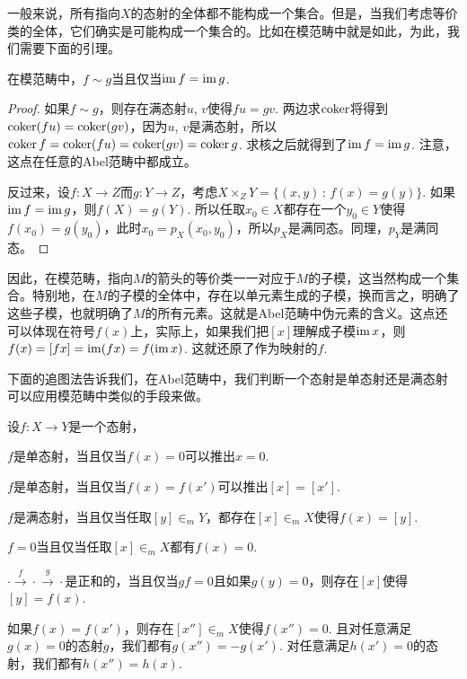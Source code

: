 一般来说，所有指向$X$的态射的全体都不能构成一个集合。但是，当我们考虑等价类的全体，它们确实是可能构成一个集合的。比如在模范畴中就是如此，为此，我们需要下面的引理。

\begin{lem}
在模范畴中，$f\sim g$当且仅当$\operatorname{im} f = \operatorname{im} g$.
\end{lem}

\begin{proof}
如果$f\sim g$，则存在满态射$u$, $v$使得$fu=gv$. 两边求$\operatorname{coker}$将得到$\operatorname{coker}(fu)=\operatorname{coker}(gv)$，因为$u$, $v$是满态射，所以$\operatorname{coker} f=\operatorname{coker}(fu)=\operatorname{coker}(gv)=\operatorname{coker} g$. 求核之后就得到了$\operatorname{im} f=\operatorname{im} g$. 注意，这点在任意的Abel范畴中都成立。

反过来，设$f:X\to Z$而$g:Y\to Z$，考虑$X\times_Z Y=\{(x,y)\,:\,f(x)=g(y)\}$. 如果$\operatorname{im} f=\operatorname{im} g$，则$f(X)=g(Y)$. 所以任取$x_0\in X$都存在一个$y_0\in Y$使得$f(x_0)=g(y_0)$，此时$x_0=p_X(x_0,y_0)$，所以$p_X$是满同态。同理，$p_Y$是满同态。
\end{proof}

因此，在模范畴，指向$M$的箭头的等价类一一对应于$M$的子模，这当然构成一个集合。特别地，在$M$的子模的全体中，存在以单元素生成的子模，换而言之，明确了这些子模，也就明确了$M$的所有元素。这就是Abel范畴中伪元素的含义。这点还可以体现在符号$f(x)$上，实际上，如果我们把$[x]$理解成子模$\operatorname{im} x$，则$f(x)=[fx]=\operatorname{im}(f x)=f(\operatorname{im} x)$. 这就还原了作为映射的$f$. 

下面的追图法告诉我们，在Abel范畴中，我们判断一个态射是单态射还是满态射可以应用模范畴中类似的手段来做。

\begin{pro}[追图法]
设$f:X\to Y$是一个态射，
\begin{compactenum}[~~~(1)]
\item $f$是单态射，当且仅当$f(x)=0$可以推出$x=0$.
\item $f$是单态射，当且仅当$f(x)=f(x')$可以推出$[x]=[x']$.
\item $f$是满态射，当且仅当任取$[y]\in_m Y$，都存在$[x]\in_m X$使得$f(x)=[y]$.
\item $f=0$当且仅当任取$[x]\in_m X$都有$f(x)=0$.
\item $\cdot \xrightarrow{f} \cdot \xrightarrow{g}\cdot$是正和的，当且仅当$gf=0$且如果$g(y)=0$，则存在$[x]$使得$[y]=f(x)$.
\item 如果$f(x)=f(x')$，则存在$[x'']\in_m X$使得$f(x'')=0$. 且对任意满足$g(x)=0$的态射$g$，我们都有$g(x'')=-g(x')$. 对任意满足$h(x')=0$的态射，我们都有$h(x'')=h(x)$.
\end{compactenum}
\end{pro}

